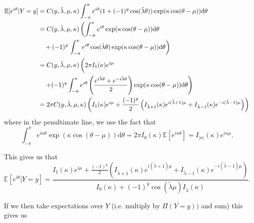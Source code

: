 \documentclass[]{report}
\begin{document}
\begin{align*}
	\mathbb{E}[e^{i \theta} | Y = y] &= C(y, \tilde{\lambda},\mu, \kappa) \int_{- \pi}^{\pi} e^{i \theta} (1 + (-1)^y \cos(\tilde{\lambda} \theta)) \exp(\kappa \cos(\theta - \mu)) \text{d} \theta \\
& =	C(y, \tilde{\lambda},\mu, \kappa) \left(  \int_{- \pi}^{\pi} e^{i \theta} \exp(\kappa \cos(\theta - \mu)) \text{d} \theta \right. \\
 & \quad + (-1)^y  \left. \int_{- \pi}^{\pi} e^{i \theta} \cos(\tilde{\lambda} \theta)   \exp(\kappa \cos(\theta - \mu)) \text{d} \theta \right)\\
 &= C(y, \tilde{\lambda},\mu, \kappa) \left( \vphantom{\int_{-\pi}^\pi} 2 \pi I_1(\kappa) e^{i \mu} \right. \\
 &\quad \left.+ (-1)^y  \int_{-\pi}^{\pi} e^{i \theta} \left( \frac{e^{i \tilde{\lambda} \theta} + e^{- i \tilde{\lambda} \theta}}{2}\right)  \exp(\kappa \cos(\theta - \mu)) \text{d} \theta \right) \\
 &= 2 \pi C(y, \tilde{\lambda},\mu, \kappa) \left( I_1(\kappa) e^{i \mu} + \frac{(-1)^y}{2} \left(I_{\tilde{\lambda} + 1}(\kappa)e^{i(\tilde{\lambda} + 1) \mu}  + I_{\tilde{\lambda} - 1}(\kappa) e^{-i(\tilde{\lambda} - 1)\mu}\right) \right)
\end{align*}
where in the penultimate line, we use the fact that
\[
\int_{- \pi}^ \pi e^{i n \theta} \exp(\kappa \cos(\theta - \mu)) \text{d} \theta = 2 \pi I_0(\kappa) \mathbb{E}[e^{i n \theta}] = I_{|n|}(\kappa) e^{i n \mu}.
\]

This gives us that
\[
\mathbb{E}[e^{i \theta} | Y = y] = \frac{ I_1(\kappa) e^{i \mu} + \frac{(-1)^y}{2} \left(I_{\tilde{\lambda} + 1}(\kappa)e^{i(\tilde{\lambda} + 1) \mu}  + I_{\tilde{\lambda} - 1}(\kappa) e^{-i(\tilde{\lambda} - 1)\mu}\right)}{I_0(\kappa) + (-1)^y \cos(\tilde{\lambda} \mu) I_{\tilde{\lambda}}(\kappa)}.
\]

If we then take expectations over $Y$ (i.e. multiply by $\Pi(Y = y))$ and sum) this gives us
\end{document}
